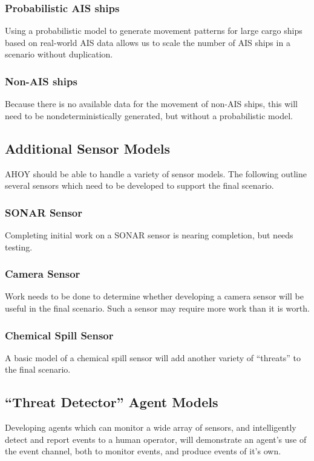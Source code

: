 \documentclass[titlepage]{article}
\begin{document}
\subsubsection{Probabilistic AIS ships}
Using a probabilistic model to generate movement patterns for large cargo ships based on real-world AIS data allows us to scale the number of AIS ships in a scenario without duplication.

\subsubsection{Non-AIS ships}
Because there is no available data for the movement of non-AIS ships, this will need to be nondeterministically generated, but without a probabilistic model.

\subsection{Additional Sensor Models}
AHOY should be able to handle a variety of sensor models. The following outline several sensors which need to be developed to support the final scenario.

\subsubsection{SONAR Sensor}
Completing initial work on a SONAR sensor is nearing completion, but needs testing.

\subsubsection{Camera Sensor}
Work needs to be done to determine whether developing a camera sensor will be useful in the final scenario. Such a sensor may require more work than it is worth.

\subsubsection{Chemical Spill Sensor}
A basic model of a chemical spill sensor will add another variety of ``threats'' to the final scenario.

\subsection{``Threat Detector'' Agent Models}
Developing agents which can monitor a wide array of sensors, and intelligently detect and report events to a human operator, will demonstrate an agent's use of the event channel, both to monitor events, and produce events of it's own.
\end{document}
